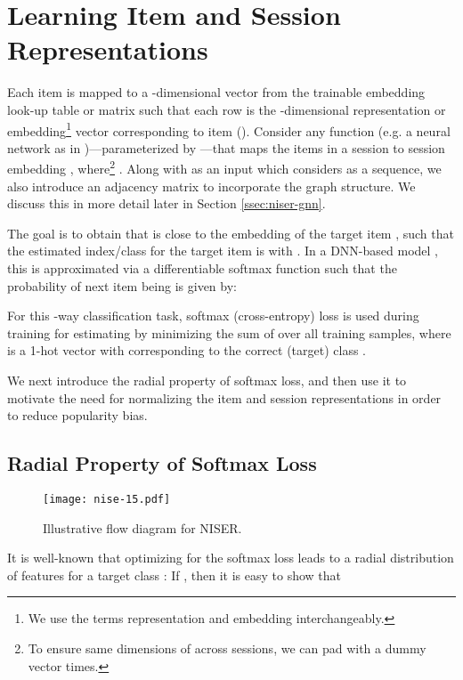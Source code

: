 \documentclass[sigconf]{acmart}
\begin{document}
\section{Learning Item and Session Representations\label{sec:approach}}
Each item is mapped to a -dimensional vector from the trainable embedding look-up table or matrix  such that each row  is the -dimensional representation or embedding\footnote{We use the terms representation and embedding interchangeably.} vector corresponding to item  (). 
Consider any function  (e.g. a neural network as in \cite{liu2018stamp,wu2018session})---parameterized by ---that maps the items in a session  to session embedding , where\footnote{To ensure same dimensions of  across sessions, we can pad with a dummy vector  times.} .
Along with  as an input which considers  as a sequence, we also introduce an adjacency matrix  to incorporate the graph structure. We discuss this in more detail later in Section \ref{ssec:niser-gnn}.

The goal is to obtain  that is close to the embedding  of the target item , such that the estimated index/class for the target item is  with . 
In a DNN-based model , this is approximated via a differentiable softmax function such that the probability of next item being  is given by:


For this -way classification task, softmax (cross-entropy) loss is used during training for estimating  by minimizing the sum of 
over all training samples, where  is a 1-hot vector with   corresponding to the correct (target) class . 

We next introduce the radial property \cite{wang2017normface,zheng2018ring} of softmax loss, and then use it to motivate the need for normalizing the item and session representations in order to reduce popularity bias.

\subsection{Radial Property of Softmax Loss}

\begin{figure*}[h]
	\texttt{[image: nise-15.pdf]}
	\caption{Illustrative flow diagram for NISER.\label{fig:niser}}
\end{figure*}

It is well-known that optimizing for the softmax loss leads to a radial distribution of features for a target class \cite{wang2017normface,zheng2018ring}: 
If , then it is easy to show that 
\end{document}
